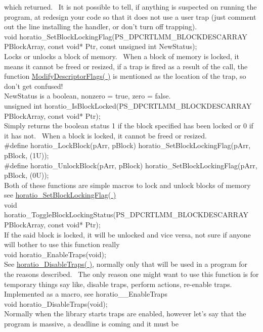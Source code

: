 \documentclass{article}
\begin{document}
which returned.~ It is not possible to tell, if anything is
suspected
on running the program, at redesign your code so that it does not use a
user trap (just comment out the line installing the handler, or don't
turn
off trapping).
\\
void
horatio\_SetBlockLockingFlag(PS\_DPCRTLMM\_BLOCKDESCARRAY
PBlockArray, const void* Ptr, const unsigned int NewStatus);
\\
Locks or unlocks a block of memory.~ When a block of memory is
locked, it means it cannot be freed or resized, if a trap is fired as a
result of the call, the function \href{#ModifyDescriptorFlags}{ModifyDescriptorFlags(
)} is mentioned as the location of the trap, so don't get confused!
\\
NewStatus is a boolean, nonzero = true, zero = false.
\\
unsigned int
horatio\_IsBlockLocked(PS\_DPCRTLMM\_BLOCKDESCARRAY
PBlockArray, const void* Ptr);
\\
Simply returns the boolean status 1 if the block specified has been
locked or 0 if it has not.~ When a block is locked, it cannot be
freed
or resized.
\\
\#define horatio\_LockBlock(pArr, pBlock)
horatio\_SetBlockLockingFlag(pArr,
pBlock, (1U));
\\
\#define horatio\_UnlockBlock(pArr, pBlock)
horatio\_SetBlockLockingFlag(pArr,
pBlock, (0U));
\\
Both of these functions are simple macros to lock and unlock blocks
of memory see \href{#SetBlockLockingFlag}{horatio\_SetBlockLockingFlag(
)}
\\
void
horatio\_ToggleBlockLockingStatus(PS\_DPCRTLMM\_BLOCKDESCARRAY
PBlockArray, const void* Ptr);
\\
If the said block is locked, it will be unlocked and vice versa, not
sure if anyone will bother to use this function really
\\
void horatio\_EnableTraps(void);
\\
See \href{#DisableTraps}{horatio\_DisableTraps( )}, normally
only that will be used in a program for the reasons described.~
The
only reason one might want to use this function is for temporary things
say like, disable traps, perform actions, re-enable traps.~
Implemented
as a macro, see horatio\_\_EnableTraps
\\
void horatio\_DisableTraps(void);
\\
Normally when the library starts traps are enabled, however let's say
that the program is massive, a deadline is coming and it must be
\end{document}
